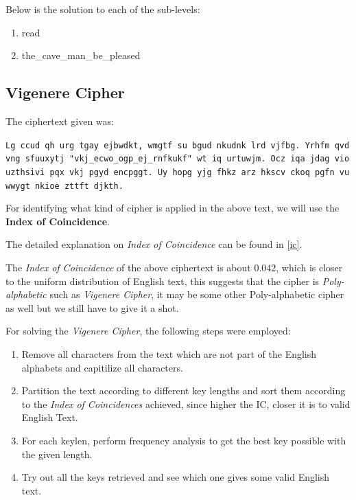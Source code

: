 \documentclass[10pt,twoside]{article}
\begin{document}
Below is the solution to each of the sub-levels:
\begin{enumerate}
  \setlength\itemsep{0em}
    \item read
    \item the\_cave\_man\_be\_pleased
\end{enumerate}

\subsection{Vigenere Cipher}
The ciphertext given was: \newline

\texttt{Lg ccud qh urg tgay ejbwdkt, wmgtf su bgud nkudnk lrd vjfbg. Yrhfm qvd vng sfuuxytj \newline "vkj\_ecwo\_ogp\_ej\_rnfkukf" wt iq urtuwjm. Ocz iqa jdag vio uzthsivi pqx vkj pgyd encpggt. Uy hopg yjg fhkz arz hkscv ckoq pgfn vu wwygt nkioe zttft djkth.} \newline

For identifying what kind of cipher is applied in the above text, we will use the \textbf{Index of Coincidence}. \newline

The detailed explanation on \textit{Index of Coincidence} can be found in \cref{ic}. \newline

The \textit{Index of Coincidence} of the above ciphertext is about $0.042$, which is closer to the uniform distribution of English text, this suggests that the cipher is \textit{Poly-alphabetic} such as \textit{Vigenere Cipher}, it may be some other Poly-alphabetic cipher as well but we still have to give it a shot. \newline

For solving the \textit{Vigenere Cipher}, the following steps were employed:
\begin{enumerate}
  \setlength\itemsep{0em}
    \item Remove all characters from the text which are not part of the English alphabets and capitilize all characters.
    \item Partition the text according to different key lengths and sort them according to the \textit{Index of Coincidences} achieved, since higher the IC, closer it is to valid English Text.
    \item For each keylen, perform frequency analysis to get the best key possible with the given length.
    \item Try out all the keys retrieved and see which one gives some valid English text.
\end{enumerate}
\end{document}
